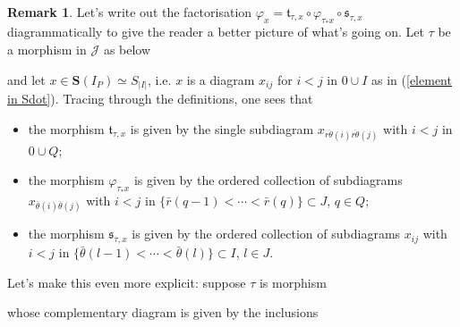 \documentclass[12pt, reqno]{amsart}
\theoremstyle{plain}
\theoremstyle{definition}
\newtheorem{remark}[theorem]{Remark}
\renewcommand{\phi}{\varphi}
\begin{document}
\begin{remark}\label{factorisation diagrammatically}
Let's write out the factorisation $\phi_x=\mathfrak{t}_{\tau,x}\circ \phi_{\tau_*x}\circ \mathfrak{s}_{\tau,x}$ diagrammatically to give the reader a better picture of what's going on. Let $\tau$ be a morphism in $\mathcal{J}$ as below
\begin{center}
\end{center}
and let $x\in \mathbf{S}(I_P)\simeq S_{|I|}$, i.e. $x$ is a diagram $x_{ij}$ for $i<j$ in $0\cup I$ as in (\ref{element in Sdot}). Tracing through the definitions, one sees that
\begin{itemize}
\item the morphism $\mathfrak{t}_{\tau,x}$ is given by the single subdiagram $x_{\overline{r\theta}(i)\overline{r\theta}(j)}$ with $i<j$ in $0\cup Q$;
\item the morphism $\phi_{\tau_*x}$ is given by the ordered collection of subdiagrams $x_{\bar{\theta}(i)\bar{\theta}(j)}$ with $i<j$ in $\{\bar{r}(q-1)<\cdots <\bar{r}(q)\}\subset J$, $q\in Q$;
\item the morphism $\mathfrak{s}_{\tau,x}$ is given by the ordered collection of subdiagrams $x_{ij}$ with $i<j$ in $\{\bar{\theta}(l-1)<\cdots <\bar{\theta}(l)\}\subset I$, $l\in J$.
\end{itemize}

Let's make this even more explicit: suppose $\tau$ is morphism
\begin{center}
\end{center}
whose complementary diagram is given by the inclusions
\begin{center}
\end{center}


\end{remark}
\end{document}
